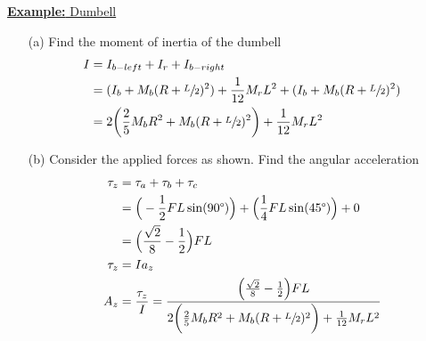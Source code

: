 \documentclass[a4paper]{article}
\let\bf\textbf
\begin{document}
\begin{shaded}
    \underline{\bf{Example:} Dumbell}\\
    \begin{enumerate}
        \item[(a)] Find the moment of inertia of the dumbell
        \begin{align*}
            I &= I_{b - left} + I_r + I_{b - right}\\
            &= (I_b + M_b(R + \sfrac{L}{2})^2) + \frac{1}{12}M_rL^2 + (I_b + M_b(R + \sfrac{L}{2})^2)\\
            &= 2\bigg(\frac{2}{5}M_bR^2 + M_b(R + \sfrac{L}{2})^2\bigg) + \frac{1}{12}M_rL^2\\
        \end{align*}
        \item[(b)] Consider the applied forces as shown. Find the angular acceleration
        \begin{align*}
            \tau_z &= \tau_a + \tau_b + \tau_c\\
            &= \Big(-\frac{1}{2}FL\sin(90\degree)\Big) + \Big(\frac{1}{4}FL\sin(45\degree)\Big) + 0\\
            &= \Big(\frac{\sqrt{2}}{8} - \frac{1}{2}\Big)FL\\
            \tau_z &= Ia_z\\
            A_z &= \frac{\tau_z}{I} = \frac{\Big(\frac{\sqrt{2}}{8} - \frac{1}{2}\Big)FL}{2\bigg(\frac{2}{5}M_bR^2 + M_b(R + \sfrac{L}{2})^2\bigg) + \frac{1}{12}M_rL^2}
        \end{align*}
    \end{enumerate}
\end{shaded}
\end{document}
